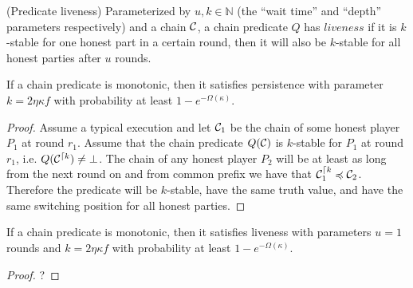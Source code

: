 \begin{definition}{(Predicate liveness)}
    Parameterized by $u, k \in \mathbb{N}$ (the ``wait time'' and ``depth''
    parameters respectively) and a chain $\mathcal{C}$, a chain predicate
    $Q$ has $\textit{liveness}$ if it is $k$-stable for one honest part
    in a certain round, then it will also be $k$-stable for all honest parties
    after $u$ rounds.
\end{definition}

\begin{theorem}
    If a chain predicate is monotonic, then it satisfies persistence with
    parameter $k = 2\eta \kappa f$ with probability at least $1 -
    e^{-\Omega(\kappa)}$.
\end{theorem}

\begin{proof}
    Assume a typical execution and let $\mathcal{C}_1$ be the chain of some honest
    player $P_1$ at round $r_1$. Assume that the chain predicate $Q(\mathcal{C})$ is
    $k$-stable for $P_1$ at round $r_1$, i.e.  $Q(\mathcal{C}^{\lceil k}) \neq \bot$.
    The chain of any honest player $P_2$ will be at least as long from the next
    round on and from common prefix we have that $\mathcal{C}_1^{\lceil k}
    \preccurlyeq \mathcal{C}_2$. Therefore the predicate will be $k$-stable, have
    the same truth value, and have the same switching position for all honest
    parties.
\end{proof}

\begin{theorem}
    If a chain predicate is monotonic, then it satisfies liveness with
    parameters $u = 1$ rounds and $k = 2\eta \kappa f$ with probability at
    least $1 - e^{-\Omega(\kappa)}$.
\end{theorem}

\begin{proof}
    ?
\end{proof}
